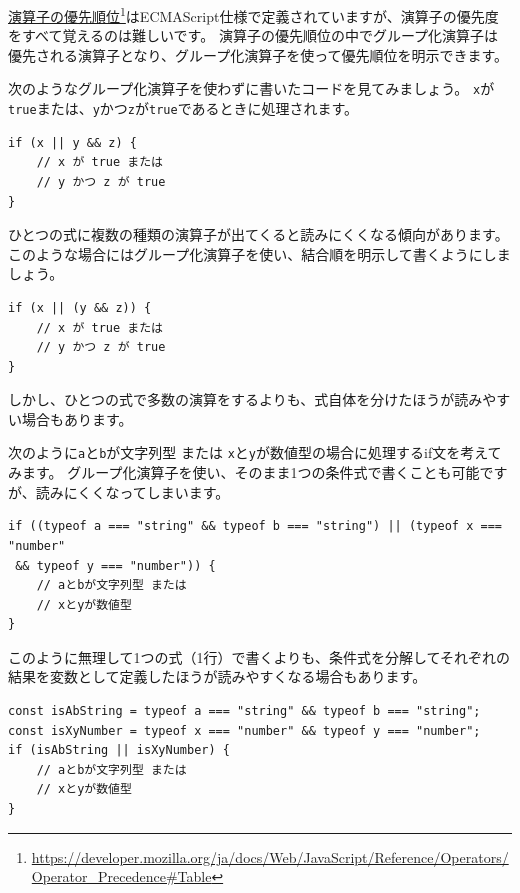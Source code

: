 \href{https://developer.mozilla.org/ja/docs/Web/JavaScript/Reference/Operators/Operator_Precedence\#Table}{演算子の優先順位}\footnote{\url{https://developer.mozilla.org/ja/docs/Web/JavaScript/Reference/Operators/Operator_Precedence\#Table}}はECMAScript仕様で定義されていますが、演算子の優先度をすべて覚えるのは難しいです。
演算子の優先順位の中でグループ化演算子は優先される演算子となり、グループ化演算子を使って優先順位を明示できます。

次のようなグループ化演算子を使わずに書いたコードを見てみましょう。
\texttt{x}が\texttt{true}または、\texttt{y}かつ\texttt{z}が\texttt{true}であるときに処理されます。

\begin{lstlisting}
if (x || y && z) {
    // x が true または
    // y かつ z が true
}
\end{lstlisting}

ひとつの式に複数の種類の演算子が出てくると読みにくくなる傾向があります。
このような場合にはグループ化演算子を使い、結合順を明示して書くようにしましょう。

\begin{lstlisting}
if (x || (y && z)) {
    // x が true または
    // y かつ z が true
}
\end{lstlisting}

しかし、ひとつの式で多数の演算をするよりも、式自体を分けたほうが読みやすい場合もあります。

次のように\texttt{a}と\texttt{b}が文字列型
または
\texttt{x}と\texttt{y}が数値型の場合に処理するif文を考えてみます。
グループ化演算子を使い、そのまま1つの条件式で書くことも可能ですが、読みにくくなってしまいます。

\begin{lstlisting}
if ((typeof a === "string" && typeof b === "string") || (typeof x === "number"
 && typeof y === "number")) {
    // aとbが文字列型 または
    // xとyが数値型
}
\end{lstlisting}

このように無理して1つの式（1行）で書くよりも、条件式を分解してそれぞれの結果を変数として定義したほうが読みやすくなる場合もあります。

\begin{lstlisting}
const isAbString = typeof a === "string" && typeof b === "string";
const isXyNumber = typeof x === "number" && typeof y === "number";
if (isAbString || isXyNumber) {
    // aとbが文字列型 または
    // xとyが数値型
}
\end{lstlisting}

